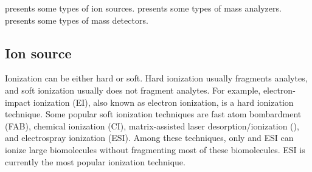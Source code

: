  presents some types of ion sources.
 presents some types of mass analyzers. 
 presents some types of mass detectors.

\subsection{Ion source}
\label{subsec:fund2:MS:ionsrc}

Ionization can be either hard or soft.
Hard ionization usually fragments analytes, and soft ionization usually does not fragment analytes. 
For example, electron-impact ionization (EI), also known as electron ionization, is a hard ionization technique. 
Some popular soft ionization techniques are 
		fast atom bombardment (FAB), 
		chemical ionization (CI),
		matrix-assisted laser desorption/ionization (),
		and electrospray ionization (\gls{ESI}).
Among these techniques, only  and \gls{ESI} can ionize large biomolecules without fragmenting most of these biomolecules. 
\Gls{ESI} is currently the most popular ionization technique. 


\def \M {\textnormal{M}}
\def \H {\textnormal{H}}

